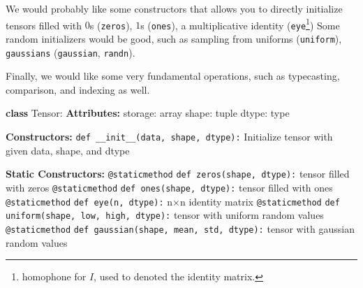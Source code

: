   We would probably like some constructors that allows you to directly initialize tensors filled with $0$s (\texttt{zeros}), $1$s (\texttt{ones}), a multiplicative identity (\texttt{eye}\footnote{homophone for $I$, used to denoted the identity matrix.}) Some random initializers would be good, such as sampling from uniforms (\texttt{uniform}), \texttt{gaussians} (\texttt{gaussian}, \texttt{randn}). 

  Finally, we would like some very fundamental operations, such as typecasting, comparison, and indexing as well. 

  \begin{algorithm}[H]
    \caption{Tensor Class Implementation}
    \begin{algorithmic}[1]
    \State \textbf{class} Tensor:
        \State \textbf{Attributes:}
        \State \hspace{1em}storage: array  
        \State \hspace{1em}shape: tuple    
        \State \hspace{1em}dtype: type     

        \State \textbf{Constructors:}
        \State \texttt{def \_\_init\_\_(data, shape, dtype):}
            \State \hspace{2em}Initialize tensor with given data, shape, and dtype

        \State \textbf{Static Constructors:}
        \State \texttt{@staticmethod}
        \State \texttt{def zeros(shape, dtype):}
            \State \hspace{2em}\Return tensor filled with zeros
        \State \texttt{@staticmethod}
        \State \texttt{def ones(shape, dtype):}
            \State \hspace{2em}\Return tensor filled with ones
        \State \texttt{@staticmethod}
        \State \texttt{def eye(n, dtype):}
            \State \hspace{2em}\Return n×n identity matrix
        \State \texttt{@staticmethod}
        \State \texttt{def uniform(shape, low, high, dtype):}
            \State \hspace{2em}\Return tensor with uniform random values
        \State \texttt{@staticmethod}
        \State \texttt{def gaussian(shape, mean, std, dtype):}
            \State \hspace{2em}\Return tensor with gaussian random values


\end{algorithmic}
\end{algorithm}
